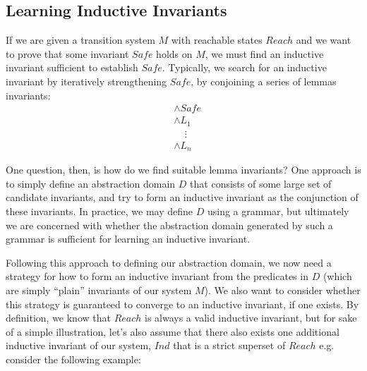 \documentclass[10pt]{article}
\begin{document}
\subsection*{Learning Inductive Invariants}

If we are given a transition system $M$ with reachable states $Reach$ and we want to prove that some invariant $Safe$ holds on $M$, we must find an inductive invariant sufficient to establish $Safe$. Typically, we search for an inductive invariant by iteratively strengthening $Safe$, by conjoining a series of lemmas invariants:
\begin{align*}
    &\wedge Safe \\
    &\wedge L_1 \\
    &\phantom{\wedge}\vdots \\
    &\wedge L_n
\end{align*}


One question, then, is how do we find suitable lemma invariants? One approach is to simply define an abstraction domain $D$ that consists of some large set of candidate invariants, and try to form an inductive invariant as the conjunction of these invariants. In practice, we may define $D$ using a grammar, but ultimately we are concerned with whether the abstraction domain generated by such a grammar is sufficient for learning an inductive invariant.

Following this approach to defining our abstraction domain, we now need a strategy for how to form an inductive invariant from the predicates in $D$ (which are simply ``plain'' invariants of our system $M$). We also want to consider whether this strategy is guaranteed to converge to an inductive invariant, if one exists. By definition, we know that $Reach$ is always a valid inductive invariant, but for sake of a simple illustration, let's also assume that there also exists one additional inductive invariant of our system, $Ind$ that is a strict superset of $Reach$ e.g. consider the following example:

\end{document}
